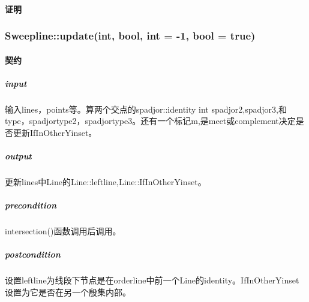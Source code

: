 \documentclass[a4paper]{book}
\numberwithin{equation}{chapter}
\theoremstyle{definition}
\begin{document}
\paragraph{证明}

\subsubsection{Sweepline::update(int, bool, int = -1, bool = true)}
\paragraph{契约}
\subparagraph{input}
输入lines，points等。算两个交点的spadjor::identity int spadjor2,spadjor3,和type，spadjortype2，spadjortype3。还有一个标记m,是meet或complement决定是否更新IfInOtherYinset。
\subparagraph{output}
更新lines中Line的Line::leftline,Line::IfInOtherYinset。
\subparagraph{precondition}
intersection()函数调用后调用。
\subparagraph{postcondition}
设置leftline为线段下节点是在orderline中前一个Line的identity。IfInOtherYinset设置为它是否在另一个殷集内部。
\end{document}
